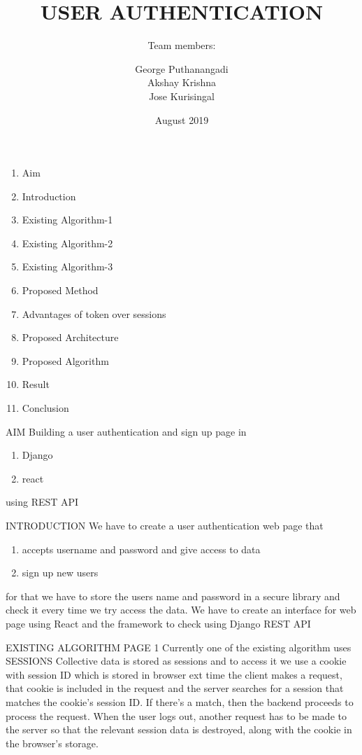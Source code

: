 \documentclass{beamer}
\title[USER AUTHENTICATION]{USER AUTHENTICATION}
\subtitle{Team members:}
\author{George Puthanangadi\\
Akshay Krishna\\
Jose Kurisingal}
\institute{Federal Institute Of Science And Technology}
\date{August 2019}
\begin{document}
\begin{frame}
\titlepage
\end{frame}
\begin{frame}
\begin{enumerate}
\item Aim
\item Introduction
\item Existing Algorithm-1
\item Existing Algorithm-2
\item Existing Algorithm-3
\item Proposed Method
\item Advantages of token over sessions
\item Proposed Architecture
\item Proposed Algorithm
\item Result
\item Conclusion
\end{enumerate}
\end{frame}
\begin{frame}{AIM}
Building a user authentication and sign up page in
\begin{enumerate}
\item Django
\item react
\end{enumerate}
using REST API
\end{frame}
\begin{frame}{INTRODUCTION}
We have to create a user authentication web page that
\begin{enumerate}

\item accepts username and password and give access to data
\item sign up new users
\end{enumerate}
for that we have to store the users name and password in a
secure library and check it every time we try access the data.
We have to create an interface for web page using React and
the framework to check using Django REST API
\end{frame}
\begin{frame}{EXISTING ALGORITHM PAGE 1}
Currently one of the existing algorithm uses SESSIONS
Collective data is stored as sessions and to access it we use a
cookie with session ID which is stored in browser ext time the
client makes a request, that cookie is included in the request
and the server searches for a session that matches the cookie’s
session ID. If there’s a match, then the backend proceeds to
process the request. When the user logs out, another request
has to be made to the server so that the relevant session data
is destroyed, along with the cookie in the browser’s storage.


\end{frame}
\end{document}

